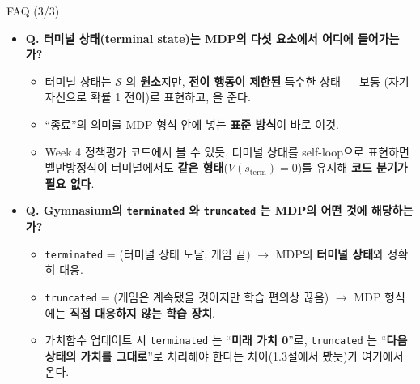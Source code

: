 \begin{frame}{FAQ (3/3)}
  \begin{itemize}
    \item \textbf{Q. 터미널 상태(terminal state)는 MDP의 다섯
      요소에서 어디에 들어가는가?}
      \begin{itemize}
        \item 터미널 상태는 $\mathcal{S}$ 의 \textbf{원소}지만,
          \textbf{전이 행동이 제한된} 특수한 상태 --- 보통
          (자기 자신으로 확률 1 전이)로 표현하고,
          을 준다.
        \item ``종료''의 의미를 MDP 형식 안에 넣는 \textbf{표준
          방식}이 바로 이것.
        \item Week 4 정책평가 코드에서 볼 수 있듯, 터미널 상태를
          self-loop으로 표현하면 벨만방정식이 터미널에서도
          \textbf{같은 형태}($V(s_{\text{term}}) = 0$)를 유지해
          \textbf{코드 분기가 필요 없다}.
      \end{itemize}
    \item \textbf{Q. Gymnasium의 \texttt{terminated} 와
      \texttt{truncated} 는 MDP의 어떤 것에 해당하는가?}
      \begin{itemize}
        \item \texttt{terminated} = (터미널 상태
          도달, 게임 끝) $\to$ MDP의 \textbf{터미널 상태}와
          정확히 대응.
        \item \texttt{truncated} = (게임은
          계속됐을 것이지만 학습 편의상 끊음) $\to$ MDP 형식에는
          \textbf{직접 대응하지 않는 학습 장치}.
        \item 가치함수 업데이트 시 \texttt{terminated} 는
          ``\textbf{미래 가치 0}''로, \texttt{truncated} 는
          ``\textbf{다음 상태의 가치를 그대로}''로 처리해야
          한다는 차이(1.3절에서 봤듯)가 여기에서 온다.
      \end{itemize}
  \end{itemize}
\end{frame}
